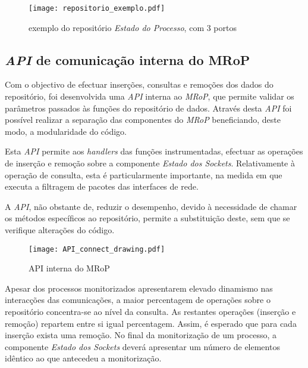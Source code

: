 \begin{figure}[!htbp]
\centering
\texttt{[image: repositorio\_exemplo.pdf]}
\caption{exemplo do repositório \textit{Estado do Processo}, com 3 portos}
\label{fig:repo_example}
\end{figure}

\subsection{\textit{API} de comunicação interna do MRoP}
\label{sub:repo_api}

Com o objectivo de efectuar inserções, consultas e remoções dos dados do repositório, foi desenvolvida uma \textit{API} interna ao \textit{MRoP}, que permite validar os parâmetros passados às funções do repositório de dados.
Através desta \textit{API} foi possível realizar a separação das componentes do \textit{MRoP} beneficiando, deste modo, a modularidade do código.

Esta \textit{API} permite aos \textit{handlers} das funções instrumentadas, efectuar as operações de inserção e remoção sobre a componente \textit{Estado dos Sockets}.
Relativamente à operação de consulta, esta é particularmente importante, na medida em que executa a filtragem de pacotes das interfaces de rede.

A \textit{API}, não obstante de, reduzir o desempenho, devido à necessidade de chamar os métodos específicos ao repositório, permite a substituição deste, sem que se verifique alterações do código.

\begin{figure}[!htbp]
\centering
\texttt{[image: API\_connect\_drawing.pdf]}
\caption{API interna do MRoP}
\label{fig:api_connect}
\end{figure}

Apesar dos processos monitorizados apresentarem elevado dinamismo nas interacções das comunicações, a maior percentagem de operações sobre o repositório concentra-se ao nível da consulta.
As restantes operações (inserção e remoção) repartem entre si igual percentagem.
Assim, é esperado que para cada inserção exista uma remoção.
No final da monitorização de um processo, a componente \textit{Estado dos Sockets} deverá apresentar um número de elementos idêntico ao que antecedeu a monitorização.




